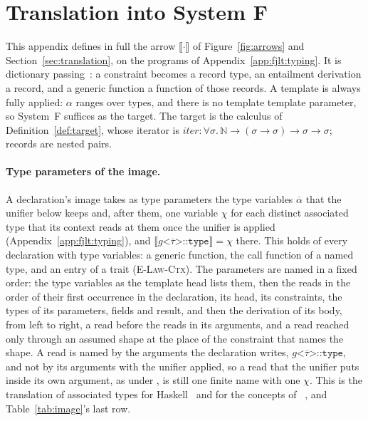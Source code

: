 \section{Translation into System F}
\label{app:fjlt:translation}
\newcommand{\note}[1]{\parbox[t]{0.31\linewidth}{\raggedright\footnotesize #1}}

This appendix defines in full the arrow $\llbracket\cdot\rrbracket$ of Figure~\ref{fig:arrows} and Section~\ref{sec:translation}, on the programs of Appendix~\ref{app:fjlt:typing}.
It is dictionary passing~\cite{wadler1989adhoc}: a constraint becomes a record type, an entailment derivation a record, and a generic function a function of those records.
A template is always fully applied: $\alpha$ ranges over types, and there is no template template parameter, so System~F suffices as the target.
The target is the calculus of Definition~\ref{def:target}, whose iterator is $\mathit{iter} : \forall\sigma.\,\mathbb{N} \to (\sigma \to \sigma) \to \sigma \to \sigma$; records are nested pairs.

\paragraph{Type parameters of the image.}
A declaration's image takes as type parameters the type variables $\overline{\alpha}$ that the unifier below keeps and, after them, one variable $\chi$ for each distinct associated type that its context reads at them once the unifier is applied (Appendix~\ref{app:fjlt:typing}), and $\llbracket g\texttt{<}\overline{\tau}\texttt{>::type} \rrbracket = \chi$ there.
This holds of every declaration with type variables: a generic function, the call function of a named type, and an entry of a trait (\textsc{E-Law-Ctx}).
The parameters are named in a fixed order: the type variables as the template head lists them, then the reads in the order of their first occurrence in the declaration, its head, its constraints, the types of its parameters, fields and result, and then the derivation of its body, from left to right, a read before the reads in its arguments, and a read reached only through an assumed shape at the place of the constraint that names the shape.
A read is named by the arguments the declaration writes, $g\texttt{<}\overline{\tau}\texttt{>::type}$, and not by its arguments with the unifier applied, so a read that the unifier puts inside its own argument, as under , is still one finite name with one $\chi$.
This is the translation of associated types for Haskell~\cite{chakravarty2005class,chakravarty2005synonyms} and for the concepts of ~\cite{siek2005essential}, and Table~\ref{tab:image}'s last row.

